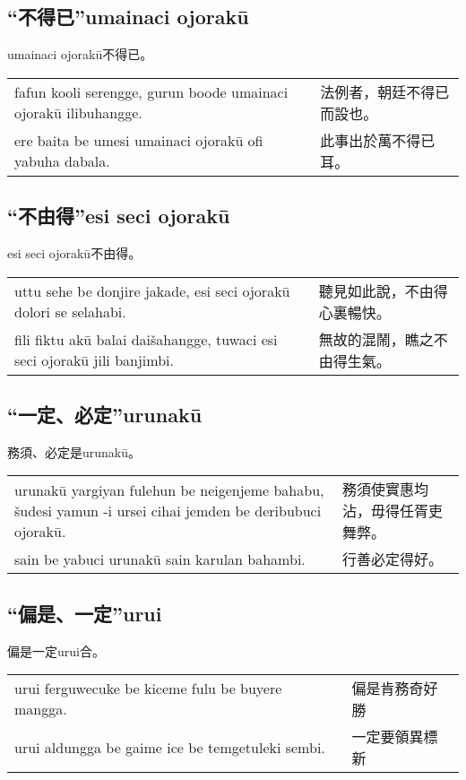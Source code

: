 \documentclass{article}
\begin{document}
\subsection{“不得已”umainaci ojorak\={u}}
\noindent umainaci ojorak\={u}不得已。
\begin{center}
    \begin{tabularx}{\textwidth}{XX}
        fafun kooli serengge, gurun boode umainaci ojorak\={u} ilibuhangge. & 法例者，朝廷不得已而設也。\\
        ere baita be umesi umainaci ojorak\={u} ofi yabuha dabala. & 此事出於萬不得已耳。
    \end{tabularx}
\end{center}

\subsection{“不由得”esi seci ojorak\={u}}
\noindent esi seci ojorak\={u}不由得。
\begin{center}
    \begin{tabularx}{\textwidth}{XX}
        uttu sehe be donjire jakade, esi seci ojorak\={u} dolori se selahabi. & 聽見如此說，不由得心裏暢快。\\
        fili fiktu ak\={u} balai dai\v{s}ahangge, tuwaci esi seci ojorak\={u} jili banjimbi. & 無故的混鬧，瞧之不由得生氣。
    \end{tabularx}
\end{center}

\subsection{“一定、必定”urunak\={u}}
\noindent 務須、必定是urunak\={u}。
\begin{center}
    \begin{tabularx}{\textwidth}{XX}
        urunak\={u} yargiyan fulehun be neigenjeme bahabu, \v{s}udesi yamun -i ursei cihai jemden be deribubuci ojorak\={u}. &務須使實惠均沾，毋得任胥吏舞弊。\\
        sain be yabuci urunak\={u} sain karulan bahambi. & 行善必定得好。
    \end{tabularx}
\end{center}

\subsection{“偏是、一定”urui}
\noindent 偏是一定urui合。
\begin{center}
    \begin{tabularx}{\textwidth}{XX}
        urui ferguwecuke be kiceme fulu be buyere mangga. & 偏是肯務奇好勝\\
        urui aldungga be gaime ice be temgetuleki sembi. &一定要領異標新\\
    \end{tabularx}
\end{center}
\end{document}
